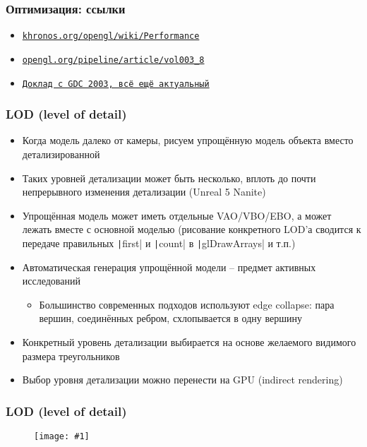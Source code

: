 \documentclass{beamer}
\newcommand{\slideimage}[1]{
  \begin{figure}
    \begin{adjustbox}{width=\textwidth, totalheight=\textheight-2\baselineskip-2\baselineskip,keepaspectratio}
      \texttt{[image: \#1]}
    \end{adjustbox}
  \end{figure}
}
\begin{document}
\begin{frame}[fragile]
\frametitle{Оптимизация: ссылки}
\begin{itemize}
\item \href{https://www.khronos.org/opengl/wiki/Performance}{\texttt{khronos.org/opengl/wiki/Performance}}
\item \href{https://www.opengl.org/pipeline/article/vol003_8}{\texttt{opengl.org/pipeline/article/vol003\_8}}
\item \href{https://www.nvidia.com/docs/IO/8230/GDC2003_OGL_Performance.pdf}{\texttt{Доклад с GDC 2003, всё ещё актуальный}}
\end{itemize}
\end{frame}

\begin{frame}[fragile]
\fontsize{10pt}{10pt}
\frametitle{LOD (level of detail)}
\begin{itemize}
\item Когда модель далеко от камеры, рисуем упрощённую модель объекта вместо детализированной
\pause
\item Таких уровней детализации может быть несколько, вплоть до почти непрерывного изменения детализации (Unreal 5 Nanite)
\pause
\item Упрощённая модель может иметь отдельные VAO/VBO/EBO, а может лежать вместе с основной моделью (рисование конкретного LOD'а сводится к передаче правильных \texttt|first| и \texttt|count| в \texttt|glDrawArrays| и т.п.)
\pause
\item Автоматическая генерация упрощённой модели -- предмет активных исследований
\begin{itemize}
\item Большинство современных подходов используют edge collapse: пара вершин, соединённых ребром, схлопывается в одну вершину
\end{itemize}
\pause
\item Конкретный уровень детализации выбирается на основе желаемого видимого размера треугольников
\pause
\item Выбор уровня детализации можно перенести на GPU (indirect rendering)
\end{itemize}
\end{frame}

\begin{frame}[fragile]
\frametitle{LOD (level of detail)}
\slideimage{lod.jpg}
\end{frame}
\end{document}
